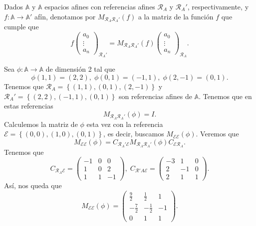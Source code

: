 \begin{notation}
Dados $\displaystyle \mathbb{A} $ y $\displaystyle \mathbb{A} $ espacios afines con referencias afines $\displaystyle \mathcal{R}_{A} $ y $\displaystyle \mathcal{R}_{A}' $, respectivamente, y $\displaystyle f : \mathbb{A} \to \mathbb{A}' $ afín, denotamos por $\displaystyle M_{\mathcal{R}_{A}\mathcal{R}_{A}'}\left(f\right) $ a la matriz de la función $\displaystyle f $ que cumple que
\[f \begin{pmatrix} a_{0} \\ \vdots \\ a_{n} \end{pmatrix}_{\mathcal{R}_{A}'} = M_{\mathcal{R}_{A}\mathcal{R}_{A}'}\left(f\right) \begin{pmatrix} a_{0} \\ \vdots \\ a_{n} \end{pmatrix}_{\mathcal{R}_{A}} .\]
\end{notation}
\begin{eg}
Sea $\displaystyle \phi : \mathbb{A} \to \mathbb{A} $ de dimensión 2 tal que 
\[\phi\left(1,1\right) = \left(2,2\right), \; \phi\left(0,1\right) = \left(-1,1\right), \; \phi\left(2,-1\right) = \left(0,1\right) .\]
Tenemos que $\displaystyle \mathcal{R}_{A} = \left\{ \left(1,1\right), \left(0,1\right), \left(2,-1\right)\right\}  $ y $\displaystyle \mathcal{R}_{A}' = \left\{ \left(2,2\right), \left(-1,1\right), \left(0,1\right)\right\} $ son referencias afines de $\displaystyle \mathbb{A} $. Tenemos que en estas referencias 
\[M_{\mathcal{R}_{A}\mathcal{R}_{A}'}\left(\phi\right) = I .\]
Calculemos la matriz de $\displaystyle \phi $ esta vez con la referencia $\displaystyle \mathcal{E} = \left\{ \left(0,0\right), \left(1,0\right), \left(0,1\right)\right\}  $, es decir, buscamos $\displaystyle M_{\mathcal{E}\mathcal{E}}\left(\phi\right) $. Veremos que
\[M_{\mathcal{E}\mathcal{E}}\left(\phi\right) = C_{\mathcal{R}_{A}'\mathcal{E}} M _{\mathcal{R}_{A}\mathcal{R}_{A}'}\left(\phi\right) C_{\mathcal{E}\mathcal{R}_{A}} .\]
Tenemos que 
\[C_{\mathcal{R}_{A}\mathcal{E}} = \begin{pmatrix} -1 & 0 & 0 \\ 1 & 0 & 2 \\ 1 & 1 & -1 \end{pmatrix}, \; C_{\mathcal{R}'A\mathcal{E}} = \begin{pmatrix} -3 & 1 & 0 \\ 2 & - 1 & 0 \\ 2 & 1 & 1 \end{pmatrix} .\]
Así, nos queda que
\[M_{\mathcal{E}\mathcal{E}}\left(\phi\right) = \begin{pmatrix} \frac{9}{2} & \frac{1}{2} & 1 \\ -\frac{7}{2} & -\frac{1}{2} & -1 \\ 0 & 1 & 1\end{pmatrix} .\]
\end{eg}

